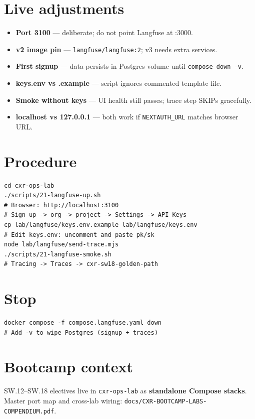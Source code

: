 \documentclass[11pt,a4paper]{report}
\begin{document}
\chapter{Live adjustments}

\begin{itemize}
  \item \textbf{Port 3100} --- deliberate; do not point Langfuse at :3000.
  \item \textbf{v2 image pin} --- \texttt{langfuse/langfuse:2}; v3 needs extra services.
  \item \textbf{First signup} --- data persists in Postgres volume until \texttt{compose down -v}.
  \item \textbf{keys.env vs .example} --- script ignores commented template file.
  \item \textbf{Smoke without keys} --- UI health still passes; trace step SKIPs gracefully.
  \item \textbf{localhost vs 127.0.0.1} --- both work if \texttt{NEXTAUTH\_URL} matches browser URL.
\end{itemize}

\chapter{Procedure}

\begin{lstlisting}[style=bash]
cd cxr-ops-lab
./scripts/21-langfuse-up.sh
# Browser: http://localhost:3100
# Sign up -> org -> project -> Settings -> API Keys
cp lab/langfuse/keys.env.example lab/langfuse/keys.env
# Edit keys.env: uncomment and paste pk/sk
node lab/langfuse/send-trace.mjs
./scripts/21-langfuse-smoke.sh
# Tracing -> Traces -> cxr-sw18-golden-path
\end{lstlisting}

\chapter{Stop}

\begin{lstlisting}[style=bash]
docker compose -f compose.langfuse.yaml down
# Add -v to wipe Postgres (signup + traces)
\end{lstlisting}

\chapter{Bootcamp context}

SW.12--SW.18 electives live in \texttt{cxr-ops-lab} as \textbf{standalone Compose stacks}.
Master port map and cross-lab wiring: \texttt{docs/CXR-BOOTCAMP-LABS-COMPENDIUM.pdf}.
\end{document}
